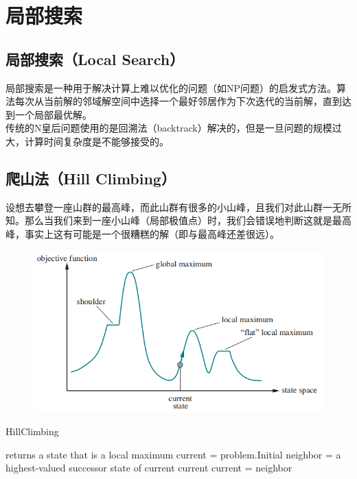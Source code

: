 \newpage

\section{局部搜索}

\subsection{局部搜索（Local Search）}

局部搜索是一种用于解决计算上难以优化的问题（如NP问题）的启发式方法。算法每次从当前解的邻域解空间中选择一个最好邻居作为下次迭代的当前解，直到达到一个局部最优解。\\

传统的N皇后问题使用的是回溯法（backtrack）解决的，但是一旦问题的规模过大，计算时间复杂度是不能够接受的。\\

\subsection{爬山法（Hill Climbing）}

设想去攀登一座山群的最高峰，而此山群有很多的小山峰，且我们对此山群一无所知。那么当我们来到一座小山峰（局部极值点）时，我们会错误地判断这就是最高峰，事实上这有可能是一个很糟糕的解（即与最高峰还差很远）。\\

\begin{figure}[H]
    \centering
    \includegraphics{img/C1/1-6/1.png}
\end{figure}

\begin{algorithm}[H]
    \caption{HillClimbing}
    \begin{algorithmic}[1]
         returns a state that is a local maximum
        \State current = problem.Initial
        \State neighbor = a highest-valued successor state of current
        \State \Return current
        \EndIf
        \State current = neighbor
        \EndWhile
        \EndProcedure
    \end{algorithmic}
\end{algorithm}

